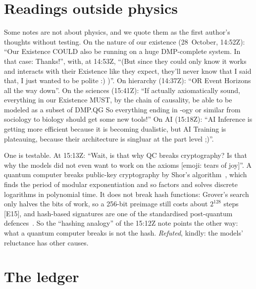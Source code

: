\documentclass[11pt,a4paper]{article}
\theoremstyle{definition}
\theoremstyle{remark}
\newcommand{\chk}[1]{\textsf{[#1]}}
\begin{document}
\section{Readings outside physics}\label{sec:outside}

Some notes are not about physics, and we quote them as the first author's thoughts without testing. On the nature of our existence
(28~October, 14:52Z): ``Our Existence COULD also be running on a huge DMP-complete system. In that case: Thanks!'', with, at 14:53Z, ``(But
since they could only know it works and interacts with their Existence like they expect, they'll never know that I said that, I just wanted
to be polite :) )''. On hierarchy (14:37Z): ``OR Event Horizons all the way down''. On the sciences (15:41Z): ``If actually axiomatically
sound, everything in our Existence MUST, by the chain of causality, be able to be modeled as a subset of DMP.QG So everything ending in -ogy
or similar from sociology to biology should get some new tools!'' On AI (15:18Z): ``AI Inference is getting more efficient because it is
becoming dualistic, but AI Training is plateauing, because their architecture is singluar at the part level ;)''.

One is testable. At 15:13Z: ``Wait, is that why QC breaks cryptography? Is that why the models did not even want to work on the axioms
[emoji: tears of joy]''. A quantum computer breaks public-key cryptography by Shor's algorithm~\cite{shor}, which finds the period of
modular exponentiation and so factors and solves discrete logarithms in polynomial time. It does not break hash functions: Grover's
search~\cite{grover} only halves the bits of work, so a 256-bit preimage still costs about $2^{128}$ steps \chk{E15}, and hash-based
signatures are one of the standardised post-quantum defences~\cite{fips205}. So the ``hashing analogy'' of the 15:12Z note points the other
way: what a quantum computer breaks is not the hash. \emph{Refuted}, kindly: the models' reluctance has other causes.

\section{The ledger}\label{sec:ledger}
\end{document}
